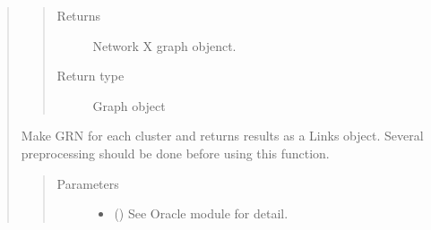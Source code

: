 \documentclass[letterpaper,10pt,english]{sphinxmanual}
\begin{document}
\begin{quote}
\begin{fulllineitems}
\begin{quote}
\begin{description}
\begin{itemize}
\end{itemize}

\item[{Returns}] \leavevmode
Network X graph objenct.

\item[{Return type}] \leavevmode
Graph object

\end{description}\end{quote}

\end{fulllineitems}


\begin{fulllineitems}
\label{\detokenize{modules/celloracle.network_analysis:celloracle.network_analysis.get_R_path}}
\end{fulllineitems}


\begin{fulllineitems}
\label{\detokenize{modules/celloracle.network_analysis:celloracle.network_analysis.get_links}}
Make GRN for each cluster and returns results as a Links object.
Several preprocessing should be done before using this function.
\begin{quote}\begin{description}
\item[{Parameters}] \leavevmode\begin{itemize}
\item {} 
 ({\hyperref[\detokenize{modules/celloracle:celloracle.Oracle}]{}}) \textendash{} See Oracle module for detail.


\end{itemize}
\end{description}
\end{quote}
\end{fulllineitems}
\end{quote}
\end{document}
